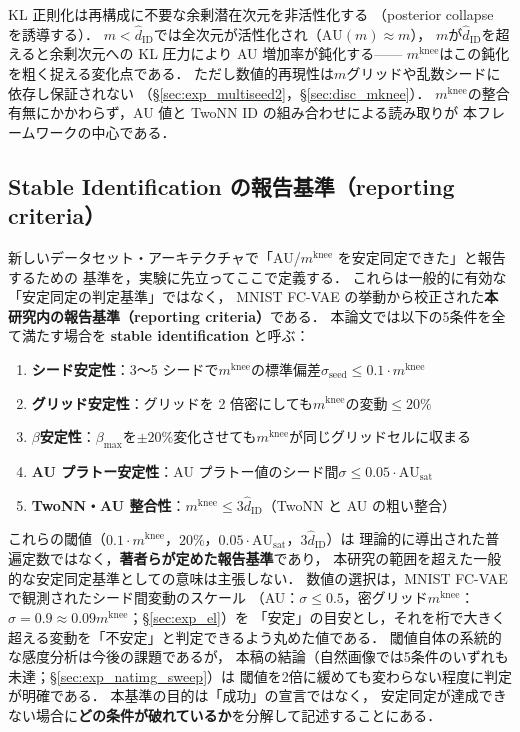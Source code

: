 \documentclass[11pt,a4paper]{jsarticle}
\newcommand{\AUsat}{\mathrm{AU}_{\mathrm{sat}}}
\newcommand{\mknee}{m^{\mathrm{knee}}}
\begin{document}
KL 正則化は再構成に不要な余剰潜在次元を非活性化する
（posterior collapse を誘導する）\cite{lucas2019elbo,higgins2017betavae}．
$m < \hat{d}_\mathrm{ID}$では全次元が活性化され（$\mathrm{AU}(m) \approx m$），
$m$が$\hat{d}_\mathrm{ID}$を超えると余剰次元への KL 圧力により AU 増加率が鈍化する——
$\mknee$はこの鈍化を粗く捉える変化点である．
ただし数値的再現性は$m$グリッドや乱数シードに依存し保証されない
（§\ref{sec:exp_multiseed2}，§\ref{sec:disc_mknee}）．
$\mknee$の整合有無にかかわらず，AU 値と TwoNN ID の組み合わせによる読み取りが
本フレームワークの中心である．

\subsection{Stable Identification の報告基準（reporting criteria）}\label{sec:natimg_stable_id}

新しいデータセット・アーキテクチャで「AU/$\mknee$ を安定同定できた」と報告するための
基準を，実験に先立ってここで定義する．
これらは一般的に有効な「安定同定の判定基準」ではなく，
MNIST FC-VAE の挙動から校正された\textbf{本研究内の報告基準（reporting criteria）}である．
本論文では以下の5条件を全て満たす場合を \textbf{stable identification} と呼ぶ：

\begin{enumerate}
  \item \textbf{シード安定性}：3〜5 シードで$\mknee$の標準偏差$\sigma_\mathrm{seed} \leq 0.1 \cdot \mknee$
  \item \textbf{グリッド安定性}：グリッドを 2 倍密にしても$\mknee$の変動$\leq 20\%$
  \item \textbf{$\beta$安定性}：$\beta_{\max}$を$\pm 20\%$変化させても$\mknee$が同じグリッドセルに収まる
  \item \textbf{AU プラトー安定性}：AU プラトー値のシード間$\sigma \leq 0.05 \cdot \AUsat$
  \item \textbf{TwoNN・AU 整合性}：$\mknee \leq 3 \hat{d}_\mathrm{ID}$（TwoNN と AU の粗い整合）
\end{enumerate}

これらの閾値（$0.1\cdot\mknee$，$20\%$，$0.05\cdot\AUsat$，$3\hat{d}_\mathrm{ID}$）は
理論的に導出された普遍定数ではなく，\textbf{著者らが定めた報告基準}であり，
本研究の範囲を超えた一般的な安定同定基準としての意味は主張しない．
数値の選択は，MNIST FC-VAE で観測されたシード間変動のスケール
（AU：$\sigma \leq 0.5$，密グリッド$\mknee$：$\sigma = 0.9 \approx 0.09\mknee$；§\ref{sec:exp_el}）を
「安定」の目安とし，それを桁で大きく超える変動を「不安定」と判定できるよう丸めた値である．
閾値自体の系統的な感度分析は今後の課題であるが，
本稿の結論（自然画像では5条件のいずれも未達；§\ref{sec:exp_natimg_sweep}）は
閾値を2倍に緩めても変わらない程度に判定が明確である．
本基準の目的は「成功」の宣言ではなく，
安定同定が達成できない場合に\textbf{どの条件が破れているか}を分解して記述することにある．
\end{document}
